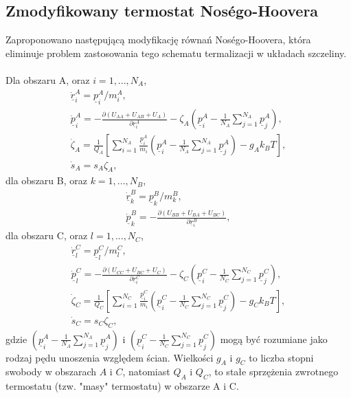 \documentclass[12pt,a4paper,openright]{report} %
\begin{document}
\subsection{Zmodyfikowany termostat Nos\'{e}go-Hoovera}
%
Zaproponowano następującą modyfikację równań Nos\'{e}go-Hoovera, która eliminuje problem zastosowania tego schematu termalizacji w układach szczeliny.\\
\\
%
Dla obszaru A, oraz $i = 1,..., N_A$,
%
\begin{equation}
\begin{gathered}
\underline{\dot{r}}^A_i=\underline{p}^A_i/m_i^A,
\\
\underline{\dot{p}}^A_i=- \frac{\partial (U_{AA} + U_{AB} +U_{A})}{\partial \underline{r}^A_i}-\zeta_A (\underline{p}^A_i-\frac{1}{N_A}\sum_{j=1}^{N_A} \underline{p}^A_j),
\\
\dot{\zeta}_A=\frac{1}{Q_A} \left[ \sum_{i=1}^{N_A} \frac{{\underline{p}^A_i}}{m_i} \left( \underline{p}^A_i-\frac{1}{N_A}\sum_{j=1}^{N_A} \underline{p}^A_j \right) -g_A k_B T \right],
\\
\dot{s}_A=s_A \zeta_A,
\end{gathered}
\label{NHA}
\end{equation}
%
dla obszaru B, oraz $k = 1,..., N_B$,
\begin{equation}
\begin{gathered}
\underline{\dot{r}}^B_k=\underline{p}^B_k/m_k^B,
\\
\underline{\dot{p}}^B_k=- \frac{\partial (U_{BB} + U_{BA} +U_{BC})}{\partial \underline{r}^B_i},
\end{gathered}
\label{NHB}
\end{equation}
%
dla obszaru C, oraz $l = 1,..., N_C$,
\begin{equation}
\begin{gathered}
\underline{\dot{r}}^C_l=\underline{p}^C_l/m_l^C,
\\
\underline{\dot{p}}^C_l=- \frac{\partial (U_{CC} + U_{BC} +U_{C})}{\partial \underline{r}^C_i}-\zeta_C (\underline{p}^C_i-\frac{1}{N_C}\sum_{j=1}^{N_C} \underline{p}^C_j),
\\
\dot{\zeta}_C=\frac{1}{Q_C} \left[ \sum_{i=1}^{N_C} \frac{{\underline{p}^C_i}}{m_i} \left( \underline{p}^C_i-\frac{1}{N_C}\sum_{j=1}^{N_C} \underline{p}^C_j \right) -g_C k_B T \right],
\\
\dot{s}_C=s_C \zeta_C,
\end{gathered}
\label{NHC}
\end{equation}
%
gdzie $(\underline{p}^A_i-\frac{1}{N_A}\sum_{j=1}^{N_A} \underline{p}^A_j)$
i $(\underline{p}^C_i-\frac{1}{N_C}\sum_{j=1}^{N_C} \underline{p}^C_j)$
%
mogą być rozumiane jako rodzaj pędu unoszenia względem ścian.
Wielkości $g_A$ i $ g_C$ to liczba stopni swobody w obszarach $A$ i $C$, natomiast $Q_A$ i $ Q_C$, to stałe sprzężenia zwrotnego termostatu (tzw. "masy" termostatu) w obszarze A i C.
\end{document}
